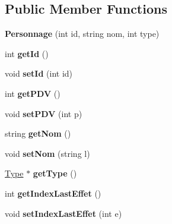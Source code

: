 \subsection*{\-Public \-Member \-Functions}
\begin{DoxyCompactItemize}
\item 
\hypertarget{class_personnage_a962f03c014911e25449829891f1e2d15}{{\bfseries \-Personnage} (int id, string nom, int type)}\label{class_personnage_a962f03c014911e25449829891f1e2d15}

\item 
\hypertarget{class_personnage_a24fbf035171564c8cb2abff10642d73c}{int {\bfseries get\-Id} ()}\label{class_personnage_a24fbf035171564c8cb2abff10642d73c}

\item 
\hypertarget{class_personnage_a5eaaea57f901cf1f04c1ee4752f03007}{void {\bfseries set\-Id} (int id)}\label{class_personnage_a5eaaea57f901cf1f04c1ee4752f03007}

\item 
\hypertarget{class_personnage_a8e5dab03a028a1c04b692f737c495979}{int {\bfseries get\-P\-D\-V} ()}\label{class_personnage_a8e5dab03a028a1c04b692f737c495979}

\item 
\hypertarget{class_personnage_ada4855cf75754881b579a3a84aba2f47}{void {\bfseries set\-P\-D\-V} (int p)}\label{class_personnage_ada4855cf75754881b579a3a84aba2f47}

\item 
\hypertarget{class_personnage_a519301399a9bee1557858aa50a04a85a}{string {\bfseries get\-Nom} ()}\label{class_personnage_a519301399a9bee1557858aa50a04a85a}

\item 
\hypertarget{class_personnage_a73b26b1b2f225f10fba5e1c294f47f8a}{void {\bfseries set\-Nom} (string l)}\label{class_personnage_a73b26b1b2f225f10fba5e1c294f47f8a}

\item 
\hypertarget{class_personnage_adc6cc2d57410d41817814775eae0fc7b}{\hyperlink{class_type}{\-Type} $\ast$ {\bfseries get\-Type} ()}\label{class_personnage_adc6cc2d57410d41817814775eae0fc7b}

\item 
\hypertarget{class_personnage_aab567206193ab8e53a6ab8a1a972123f}{int {\bfseries get\-Index\-Last\-Effet} ()}\label{class_personnage_aab567206193ab8e53a6ab8a1a972123f}

\item 
\hypertarget{class_personnage_a11d434b9150ee0bd6487f34b6afbdf44}{void {\bfseries set\-Index\-Last\-Effet} (int e)}\label{class_personnage_a11d434b9150ee0bd6487f34b6afbdf44}


\end{DoxyCompactItemize}
